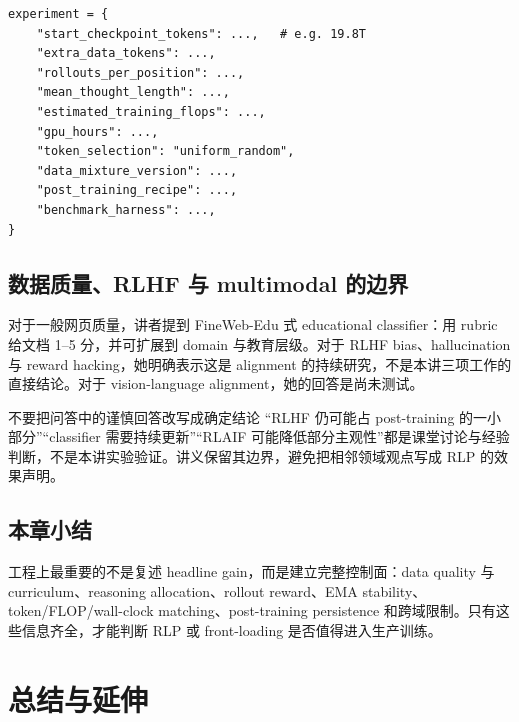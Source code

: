 \documentclass[a4paper]{article}
\begin{document}


\begin{lstlisting}[caption={评估 RLP 时建议记录的最小实验表}]
experiment = {
    "start_checkpoint_tokens": ...,   # e.g. 19.8T
    "extra_data_tokens": ...,
    "rollouts_per_position": ...,
    "mean_thought_length": ...,
    "estimated_training_flops": ...,
    "gpu_hours": ...,
    "token_selection": "uniform_random",
    "data_mixture_version": ...,
    "post_training_recipe": ...,
    "benchmark_harness": ...,
}
\end{lstlisting}

\subsection{数据质量、RLHF 与 multimodal 的边界}

对于一般网页质量，讲者提到 FineWeb-Edu 式 educational classifier：用 rubric 给文档 1--5 分，并可扩展到 domain 与教育层级。对于 RLHF bias、hallucination 与 reward hacking，她明确表示这是 alignment 的持续研究，不是本讲三项工作的直接结论。对于 vision-language alignment，她的回答是尚未测试。

\begin{warningbox}{不要把问答中的谨慎回答改写成确定结论}
“RLHF 仍可能占 post-training 的一小部分”“classifier 需要持续更新”“RLAIF 可能降低部分主观性”都是课堂讨论与经验判断，不是本讲实验验证。讲义保留其边界，避免把相邻领域观点写成 RLP 的效果声明。
\end{warningbox}

\subsection{本章小结}

工程上最重要的不是复述 headline gain，而是建立完整控制面：data quality 与 curriculum、reasoning allocation、rollout reward、EMA stability、token/FLOP/wall-clock matching、post-training persistence 和跨域限制。只有这些信息齐全，才能判断 RLP 或 front-loading 是否值得进入生产训练。

\section{总结与延伸}
\end{document}
